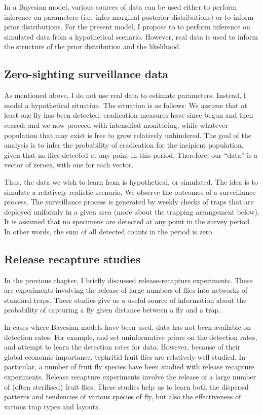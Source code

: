 \documentclass[
  oneside]{book}
\begin{document}
In a Bayesian model, various sources of data can be used either to perform inference on parameters (i.e.~infer marginal posterior distributions) or to inform prior distributions. For the present model, I propose to to perform inference on simulated data from a hypothetical scenario. However, real data is used to inform the structure of the prior distribution and the likelihood.

\hypertarget{zero-sighting-surveillance-data}{%
\subsection{Zero-sighting surveillance data}\label{zero-sighting-surveillance-data}}

As mentioned above, I do not use real data to estimate parameters. Instead, I model a hypothetical situation. The situation is as follows: We assume that at least one fly has been detected; eradication measures have since begun and then ceased; and we now proceed with intensified monitoring, while whatever population that may exist is free to grow relatively unhindered. The goal of the analysis is to infer the probability of eradication for the incipient population, given that no flies detected at any point in this period. Therefore, our ``data'' is a vector of zeroes, with one for each vector.

Thus, the data we wish to learn from is hypothetical, or simulated. The idea is to simulate a relatively realistic scenario. We observe the outcomes of a surveillance process. The surveillance process is generated by weekly checks of traps that are deployed uniformly in a given area (more about the trapping arrangement below). It is assumed that no specimens are detected at any point in the survey period. In other words, the sum of all detected counts in the period is zero.

\hypertarget{release-recapture-studies}{%
\subsection{Release recapture studies}\label{release-recapture-studies}}

In the previous chapter, I briefly discussed release-recapture experiments. These are experiments involving the release of large numbers of flies into networks of standard traps. These studies give us a useful source of information about the probability of capturing a fly given distance between a fly and a trap.

In cases where Bayesian models have been used, data has not been available on detection rates. For example, \citet{caley2014} and \citet{keith2013} set uninformative priors on the detection rates, and attempt to learn the detection rates for data. However, because of their global economic importance, tephritid fruit flies are relatively well studied. In particular, a number of fruit fly species have been studied with release recapture experiments. Release recapture experiments involve the release of a large number of (often sterilised) fruit flies. These studies help us to learn both the dispersal patterns and tendencies of various species of fly, but also the effectiveness of various trap types and layouts.
\end{document}

